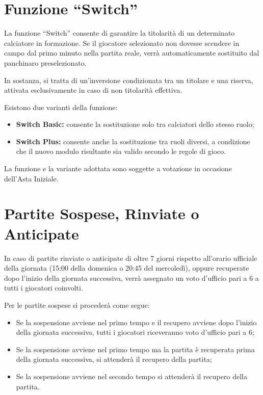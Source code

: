 \section{Funzione “Switch”}
\label{art:5.6}

La funzione “Switch” consente di garantire la titolarità di un determinato calciatore in formazione. Se il giocatore selezionato non dovesse scendere in campo dal primo minuto nella partita reale, verrà automaticamente sostituito dal panchinaro preselezionato.

In sostanza, si tratta di un'inversione condizionata tra un titolare e una riserva, attivata esclusivamente in caso di non titolarità effettiva.

\noindent Esistono due varianti della funzione:

\begin{itemize}
    \item \textbf{Switch Basic:} consente la sostituzione solo tra calciatori dello stesso ruolo;
    \item \textbf{Switch Plus:} consente anche la sostituzione tra ruoli diversi, a condizione che il nuovo modulo risultante sia valido secondo le regole di gioco.
\end{itemize}

La funzione e la variante adottata sono soggette a votazione in occasione dell'Asta Iniziale.

\section{Partite Sospese, Rinviate o Anticipate}
\label{art:5.7}

In caso di partite rinviate o anticipate di oltre 7 giorni rispetto all'orario ufficiale della giornata (15:00 della domenica o 20:45 del mercoledì), oppure recuperate dopo l'inizio della giornata successiva, verrà assegnato un voto d'ufficio pari a 6 a tutti i giocatori coinvolti.

\noindent Per le partite sospese si procederà come segue:

\begin{itemize}
    \item Se la sospensione avviene nel primo tempo e il recupero avviene dopo l'inizio della giornata successiva, tutti i giocatori riceveranno voto d'ufficio pari a 6;
    \item Se la sospensione avviene nel primo tempo ma la partita è recuperata prima della giornata successiva, si attenderà il recupero della partita;
    \item Se la sospensione avviene nel secondo tempo si attenderà il recupero della partita.
\end{itemize}

